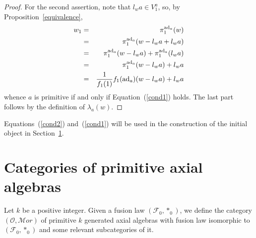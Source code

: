 \documentclass[a4paper]{amsart}
\newcommand{\ad}{{\rm ad}}
\begin{document}
\begin{proof}
For the second assertion, note that $l_wa\in V_1^a$, so, by Proposition~\ref{equivalence},
\begin{eqnarray*}
w_1&=&\pi_1^{\ad_a}(w)\\
&=&\pi_1^{\ad_a}(w-l_wa+l_wa)\\
&=&\pi_1^{\ad_a}(w-l_wa)+\pi_1^{\ad_a}(l_wa)\\
&=&\pi_1^{\ad_a}(w-l_wa)+l_wa\\
&=&\frac{1}{f_1(1)}f_1(\ad_a)(w-l_wa)+l_wa
\end{eqnarray*}
whence $a$ is primitive if and only if Equation~(\ref{cond1}) holds. The last part follows by the definition of $\lambda_a(w)$.
\end{proof}
Equations~(\ref{cond2}) and~(\ref{cond1}) will be used in the construction of the initial object in Section~\ref{3}.

\section{Categories of primitive axial algebras}\label{3}

Let $k$ be a positive integer. Given a fusion law $(\mathcal F_0,  \ast_0)$,   we define the category $({\mathcal O},{\mathcal Mor})$ of primitive $k$ generated axial algebras with fusion law isomorphic to $(\mathcal F_0,  \ast_0)$ and some relevant subcategories of it.
\end{document}
